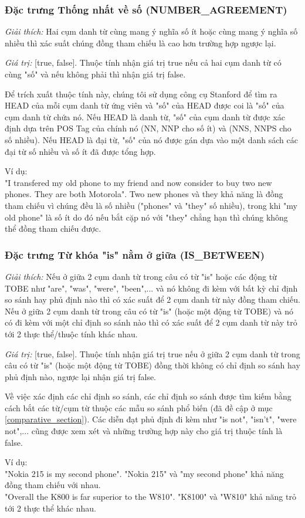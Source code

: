 \documentclass[12pt]{report}
\begin{document}
				\subsubsection*{Đặc trưng Thống nhất về số (NUMBER\_AGREEMENT)}
					\par \textit{Giải thích:} Hai cụm danh từ cùng mang ý nghĩa số ít hoặc cùng mang ý nghĩa số nhiều thì xác suất chúng đồng tham chiếu là cao hơn trường hợp ngược lại. 
					\par \textit{Giá trị:} [true, false]. Thuộc tính nhận giá trị true nếu cả hai cụm danh từ có cùng "số" và nếu không phải thì nhận giá trị false.
					\par Để trích xuất thuộc tính này, chúng tôi sử dụng công cụ Stanford để tìm ra HEAD của mỗi cụm danh từ ứng viên và "số" của HEAD được coi là "số" của cụm danh từ chứa nó. Nếu HEAD là danh từ, "số" của cụm danh từ được xác định dựa trên POS Tag của chính nó (NN, NNP cho số ít) và (NNS, NNPS cho số nhiều). Nếu HEAD là đại từ, "số" của nó được gán dựa vào một danh sách các đại từ số nhiều và số ít đã được tổng hợp.
					\par Ví dụ:
					\\"I transfered my old phone to my friend and now consider to buy two new phones. They are both Motorola". Two new phones và they khả năng là đồng tham chiếu vì chúng đều là số nhiều ("phones" và "they" số nhiều), trong khi "my old phone" là số ít do đó nếu bắt cặp nó với "they" chẳng hạn thì chúng không thể đồng tham chiếu được.				

				\subsubsection*{Đặc trưng Từ khóa "is" nằm ở giữa (IS\_BETWEEN)}
					\par \textit{Giải thích:} Nếu ở giữa 2 cụm danh từ trong câu có từ "is" hoặc các động từ TOBE như "are", "was", "were", "been",... và nó không đi kèm với bất kỳ chỉ định so sánh hay phủ định nào thì có xác suất để 2 cụm danh từ này đồng tham chiếu. Nếu ở giữa 2 cụm danh từ trong câu có từ "is" (hoặc một động từ TOBE) và nó có đi kèm với một chỉ định so sánh nào thì có xác suất để 2 cụm danh từ này trỏ tới 2 thực thể/thuộc tính khác nhau.
					\par \textit{Giá trị:} [true, false]. Thuộc tính nhận giá trị true nếu ở giữa 2 cụm danh từ trong câu có từ "is" (hoặc một động từ TOBE) đồng thời không có chỉ định so sánh hay phủ định nào, ngược lại nhận giá trị false.
					\par Về việc xác định các chỉ định so sánh, các chỉ định so sánh được tìm kiếm bằng cách bắt các từ/cụm từ thuộc các mẫu so sánh phổ biến (đã đề cập ở mục \ref{comparative_section}). Các diễn đạt phủ định đi kèm như "is not", "isn't", "were not",... cũng được xem xét và những trường hợp này cho giá trị thuộc tính là false.
					\par Ví dụ: 
					\\"Nokia 215 is my second phone". "Nokia 215" và "my second phone" khả năng đồng tham chiếu với nhau.
					\\"Overall the K800 is far superior to the W810". "K8100" và "W810" khả năng trỏ tới 2 thực thể khác nhau.
\end{document}
